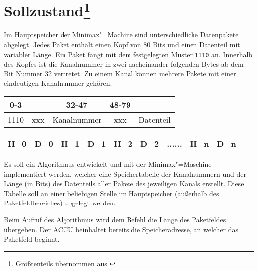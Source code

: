\chapter[Sollzustand]{Sollzustand\footnote{Größtenteils übernommen aus \cite{aufgabenblatt}}}
\label{chapter:Pflichtenheft-Sollzustand}

Im Hauptspeicher der Minimax"=Machine sind unterschiedliche Datenpakete abgelegt. Jedes Paket enthält einen Kopf von 80 Bits und einen Datenteil mit variabler Länge. Ein Paket fängt mit dem festgelegten Muster \texttt{1110} an. Innerhalb des Kopfes ist die Kanalnummer in zwei nacheinander folgenden Bytes ab dem Bit Nummer 32 vertretet. Zu einem Kanal können mehrere Pakete mit einer eindeutigen Kanalnummer gehören.

\begin{center}
    \begin{tabular}{|c|c|c|c|c|}
        \multicolumn{1}{c}{0-3} & \multicolumn{1}{c}{} & \multicolumn{1}{c}{32-47} & \multicolumn{1}{c}{48-79} & \multicolumn{1}{c}{} \\
        \hline
        1110 & xxx & Kanalnummer & xxx & \hspace{1cm} Datenteil \hspace{1cm} \\
        \hline
    \end{tabular}
\end{center}

\begin{center}
    \begin{tabular}{|c|c|c|c|c|c|c|c|c|}
        \hline
        H_0 & \hspace{.3cm} D_0 \hspace*{.3cm} & H_1 & D_1 & H_2 & \hspace{1cm} D_2 \hspace*{1cm} & ...... & H_n & D_n \\
        \hline
    \end{tabular}
\end{center}

Es soll ein Algorithmus entwickelt und mit der Minimax"=Maschine implementiert werden, welcher eine Speichertabelle der Kanalnummern und der Länge (in Bits) des Datenteils aller Pakete des jeweiligen Kanals erstellt. Diese Tabelle soll an einer beliebigen Stelle im Hauptspeicher (außerhalb des Paketfeldbereiches) abgelegt werden.

Beim Aufruf des Algorithmus wird dem Befehl die Länge des Paketfeldes übergeben. Der ACCU beinhaltet bereits die Speicheradresse, an welcher das Paketfeld beginnt.

